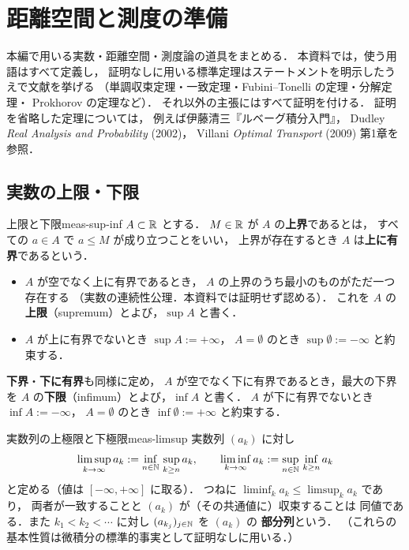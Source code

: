 \chapter{距離空間と測度の準備}
\label{ch:found-preliminaries}

本編で用いる実数・距離空間・測度論の道具をまとめる．
本資料では，使う用語はすべて定義し，
証明なしに用いる標準定理はステートメントを明示したうえで文献を挙げる
（単調収束定理・一致定理・Fubini--Tonelli の定理・分解定理・
Prokhorov の定理など）．
それ以外の主張にはすべて証明を付ける．
証明を省略した定理については，
例えば伊藤清三『ルベーグ積分入門』，
Dudley \emph{Real Analysis and Probability} (2002)，
Villani \emph{Optimal Transport} (2009) 第1章を参照．

\section{実数の上限・下限}

\begin{definition}{上限と下限}{meas-sup-inf}
  $A\subset\mathbb{R}$ とする．
  $M\in\mathbb{R}$ が $A$ の\textbf{上界}であるとは，
  すべての $a\in A$ で $a\leq M$ が成り立つことをいい，
  上界が存在するとき $A$ は\textbf{上に有界}であるという．
  \begin{itemize}
    \item $A$ が空でなく上に有界であるとき，
      $A$ の上界のうち最小のものがただ一つ存在する
      （実数の連続性公理．本資料では証明せず認める）．
      これを $A$ の\textbf{上限}（supremum）とよび，$\sup A$ と書く．
    \item $A$ が上に有界でないとき $\sup A:=+\infty$，
      $A=\emptyset$ のとき $\sup\emptyset:=-\infty$ と約束する．
  \end{itemize}
  \textbf{下界}・\textbf{下に有界}も同様に定め，
  $A$ が空でなく下に有界であるとき，最大の下界を
  $A$ の\textbf{下限}（infimum）とよび，$\inf A$ と書く．
  $A$ が下に有界でないとき $\inf A:=-\infty$，
  $A=\emptyset$ のとき $\inf\emptyset:=+\infty$ と約束する．
\end{definition}

\begin{definition}{実数列の上極限と下極限}{meas-limsup}
  実数列 $(a_k)$ に対し
  \[
    \limsup_{k\to\infty}a_k
    :=\inf_{n\in\mathbb{N}}\,\sup_{k\geq n}a_k,
    \qquad
    \liminf_{k\to\infty}a_k
    :=\sup_{n\in\mathbb{N}}\,\inf_{k\geq n}a_k
  \]
  と定める（値は $[-\infty,+\infty]$ に取る）．
  つねに $\liminf_ka_k\leq\limsup_ka_k$ であり，
  両者が一致することと $(a_k)$ が（その共通値に）収束することは
  同値である．また
  $k_1<k_2<\cdots$ に対し $(a_{k_j})_{j\in\mathbb{N}}$ を $(a_k)$ の
  \textbf{部分列}という．
  （これらの基本性質は微積分の標準的事実として証明なしに用いる．）
\end{definition}

